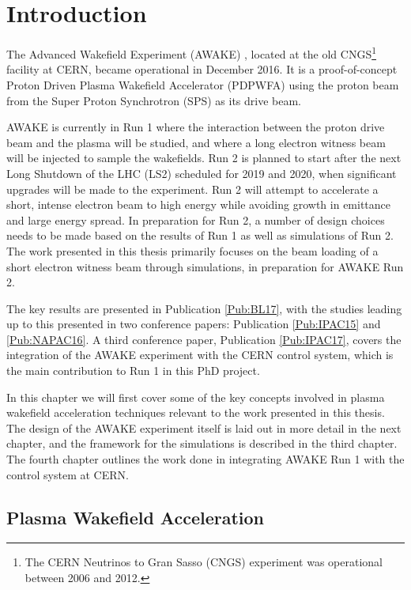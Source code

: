 %
%

\chapter{Introduction}
\label{Ch:Intro}

The Advanced Wakefield Experiment (AWAKE) \cite{awake_collaboration:2014}, located at the old CNGS\footnote{The CERN Neutrinos to Gran Sasso (CNGS) experiment was operational between 2006 and 2012.} facility at CERN, became operational in December 2016. It is a proof-of-concept Proton Driven Plasma Wakefield Accelerator (PDPWFA) using the proton beam from the Super Proton Synchrotron (SPS) as its drive beam.

AWAKE is currently in Run 1 where the interaction between the proton drive beam and the plasma will be studied, and where a long electron witness beam will be injected to sample the wakefields. Run 2 is planned to start after the next Long Shutdown of the LHC (LS2) scheduled for 2019 and 2020, when significant upgrades will be made to the experiment. Run 2 will attempt to accelerate a short, intense electron beam to high energy while avoiding growth in emittance and large energy spread. In preparation for Run 2, a number of design choices needs to be made based on the results of Run 1 as well as simulations of Run 2. The work presented in this thesis primarily focuses on the beam loading of a short electron witness beam through simulations, in preparation for AWAKE Run 2.

The key results are presented in Publication \ref{Pub:BL17}, with the studies leading up to this presented in two conference papers: Publication \ref{Pub:IPAC15} and \ref{Pub:NAPAC16}. A third conference paper, Publication \ref{Pub:IPAC17}, covers the integration of the AWAKE experiment with the CERN control system, which is the main contribution to Run 1 in this PhD project.

In this chapter we will first cover some of the key concepts involved in plasma wakefield acceleration techniques relevant to the work presented in this thesis. The design of the AWAKE experiment itself is laid out in more detail in the next chapter, and the framework for the simulations is described in the third chapter. The fourth chapter outlines the work done in integrating AWAKE Run 1 with the control system at CERN.

\section{Plasma Wakefield Acceleration}
\label{Int:PWFA}

